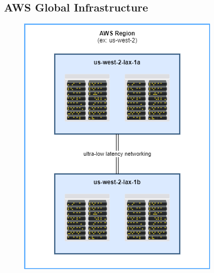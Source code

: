 \subsection{AWS Global Infrastructure}
\begin{figure}[h]
\includegraphics[scale=0.5]{cloud_computing/regions}
\centering
\end{figure}

